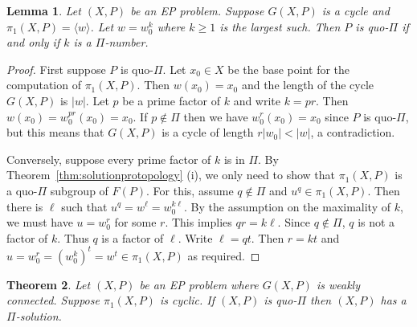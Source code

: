 \documentclass[10pt,a4paper]{amsart}
\newtheorem{theorem}{Theorem}[section]
\newtheorem{lemma}[theorem]{Lemma}
\theoremstyle{definition}
\theoremstyle{definition}
\numberwithin{equation}{section}
\begin{document}
\begin{lemma}\label{lem:pfk} Let $(X, P)$ be an EP problem. Suppose $G(X, P)$ is a cycle and $\pi_1(X, P)=\langle w\rangle$. Let $w=w_0^k$  where $k\geq 1$ is the largest such. Then $P$ is quo-$\Pi$ if and only if $k$ is a $\Pi$-number.
\end{lemma}

\begin{proof} First suppose $P$ is quo-$\Pi$. Let $x_0\in X$ be the base point for the computation of $\pi_1(X,P)$. Then $w(x_0)=x_0$ and the length of the cycle $G(X,P)$ is $|w|$. Let $p$ be a prime factor of $k$ and write $k=pr$. Then $w(x_0)=w_0^{pr}(x_0)=x_0$. If $p\not\in \Pi$ then we have $w_0^r(x_0)=x_0$ since $P$ is quo-$\Pi$, but this means that $G(X,P)$ is a cycle of length $r|w_0|<|w|$, a contradiction.

Conversely, suppose every prime factor of $k$ is in $\Pi$. By Theorem~\ref{thm:solutionprotopology} (i), we only need to show that $\pi_1(X, P)$ is a quo-$\Pi$ subgroup of $F(P)$. For this, assume $q\not\in\Pi$ and $u^q\in \pi_1(X, P)$. Then there is $\ell$ such that $u^q=w^\ell=w_0^{k\ell}$. By the assumption on the maximality of $k$, we must have $u=w_0^r$ for some $r$. This implies $qr=k\ell$. Since $q\not\in \Pi$, $q$ is not a factor of $k$. Thus $q$ is a factor of $\ell$. Write $\ell=qt$. Then $r=kt$
and $u=w_0^r=(w_0^k)^t=w^t\in \pi_1(X, P)$ as required.
\end{proof}

\begin{theorem}\label{thm:cyclic} Let $(X, P)$ be an EP problem where $G(X, P)$ is weakly connected. Suppose $\pi_1(X, P)$ is cyclic. If $(X, P)$ is quo-$\Pi$ then $(X, P)$ has a $\Pi$-solution.
\end{theorem}
\end{document}
